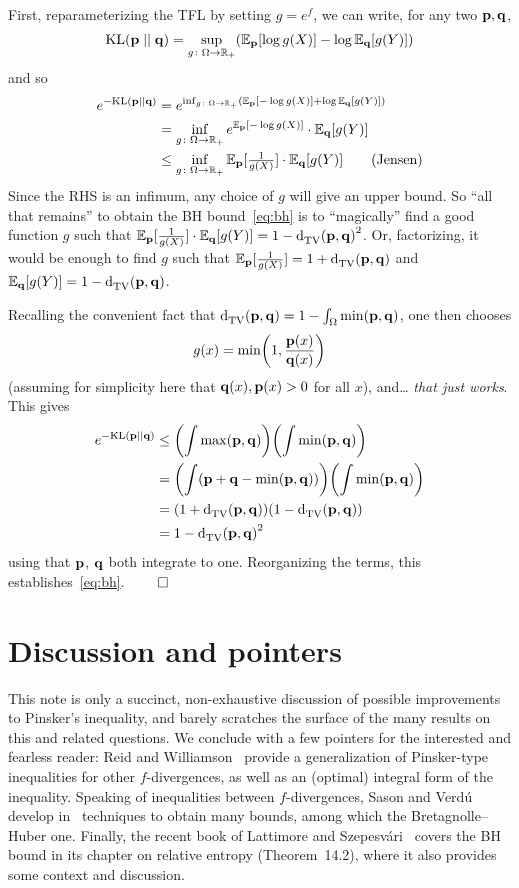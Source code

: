 \documentclass[10pt]{article}
\begin{document}
First, reparameterizing the TFL by setting $g = e^f$, we can write, for any two $\mathbf{p},\mathbf{q}$,
\[
    \kldiv{\p}{\q} = \sup_{g\colon \Omega\to\R_+} \mleft( \shortexpect_{\p}[\log g(X)] - \log \shortexpect_{\q}[g(Y)] \mright)
\]
and so
\begin{align*}
	e^{-\kldiv{\p}{\q}} &= e^{\inf_{g\colon \Omega\to\R_+} \mleft( \shortexpect_{\p}[-\log g(X)] + \log \shortexpect_{\q}[g(Y)] \mright)}\\
	&= \inf_{g\colon \Omega\to\R_+} e^{\shortexpect_{\p}[-\log g(X)]}\cdot \shortexpect_{\q}[g(Y)] \\
	&\leq \inf_{g\colon \Omega\to\R_+} \shortexpect_{\p}[\tfrac{1}{g(X)}]\cdot \shortexpect_{\q}[g(Y)] \tag{Jensen}
\end{align*}
Since the RHS is an infimum, any choice of $g$ will give an upper bound. So ``all that remains'' to obtain the BH bound~\eqref{eq:bh} is to ``magically'' find a good function $g$ such that $\shortexpect_{\p}[\tfrac{1}{g(X)}]\cdot \shortexpect_{\q}[g(Y)] = 1- \totalvardist{\p}{\q}^2$. Or, factorizing, it would be enough to find $g$ such that $\shortexpect_{\p}[\tfrac{1}{g(X)}] =1 + \totalvardist{\p}{\q}$ and $\shortexpect_{\q}[g(Y)] = 1- \totalvardist{\p}{\q}$. 

Recalling the convenient fact that $\totalvardist{\p}{\q} = 1 - \int_\Omega \min(\p,\q)$, one then chooses 
\[
g(x) = \min\mleft( 1, \frac{\p(x)}{\q(x)}\mright)
\]
(assuming for simplicity here that $\mathbf{q}(x),\mathbf{p}(x)>0$ for all $x$), and\dots{} \emph{that just works}. This gives
\begin{align*}
	e^{-\kldiv{\p}{\q}} &\leq 
	\mleft(\int \max(\p,\q)\mright) \mleft(\int \min(\p,\q)\mright) \\
	&= \mleft(\int \mleft(\p+\q - \min(\p,\q)\mright)\mright) \mleft(\int \min(\p,\q)\mright) \\
	&= \mleft(1 + \totalvardist{\p}{\q}\mright) \mleft(1- \totalvardist{\p}{\q}\mright) \\
	&= 1- \totalvardist{\p}{\q}^2\,
\end{align*}
using that $\mathbf{p}$, $\mathbf{q}$ both integrate to one. Reorganizing the terms, this establishes~\eqref{eq:bh}. $\qed$

\section{Discussion and pointers}
  \label{sec:discussion}
This note is only a succinct, non-exhaustive discussion of possible improvements to Pinsker's inequality, and barely scratches the surface of the many results on this and related questions. We conclude with a few pointers for the interested and fearless reader: Reid and Williamson~\cite{ReidW09} provide a generalization of Pinsker-type inequalities for other $f$-divergences, as well as an  (optimal) integral form of the inequality. Speaking of inequalities between $f$-divergences, Sason and Verd\'u develop in~\cite{SasonV16} techniques to obtain many bounds, among which the Bretagnolle--Huber one. Finally, the recent book of Lattimore and Szepesv{\'a}ri~\cite{LaSze20} covers the BH bound in its chapter on relative entropy (Theorem~14.2), where it also provides some context and discussion.
\end{document}
